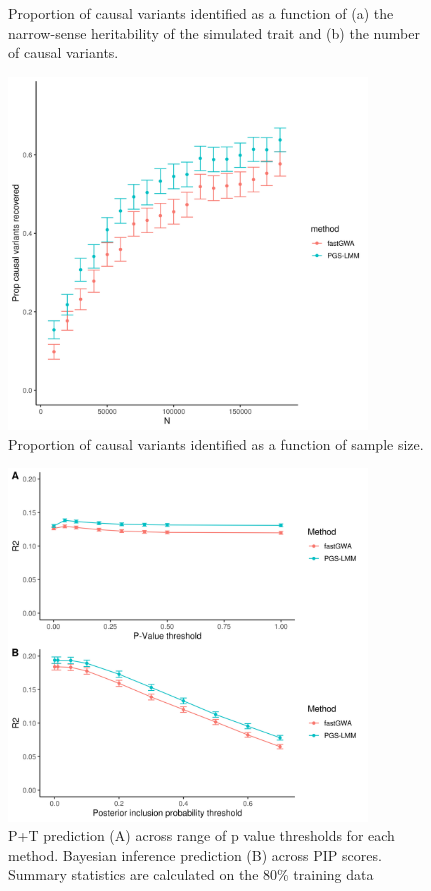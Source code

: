 \documentclass[doublespacing]{bmcart}
\begin{document}
\begin{backmatter}
\begin{figure}[h!]
  \caption{
      Proportion of causal variants identified as a function of (a) the narrow-sense heritability of the simulated trait and (b) the number of causal variants.}
      \end{figure}

\begin{figure}[h!]
  \includegraphics[width=0.85\textwidth]{images/Fig4.png}

  \caption{
      Proportion of causal variants identified as a function of sample size.}
      \end{figure}
      
\begin{figure}[h!]
  \includegraphics[width=0.85\textwidth]{images/Fig5.png}
  \caption{
      P+T prediction (A) across range of p value thresholds for each method. Bayesian inference prediction (B) across PIP scores. Summary statistics are calculated on the 80\% training data}
      \end{figure}


\end{backmatter}
\end{document}
